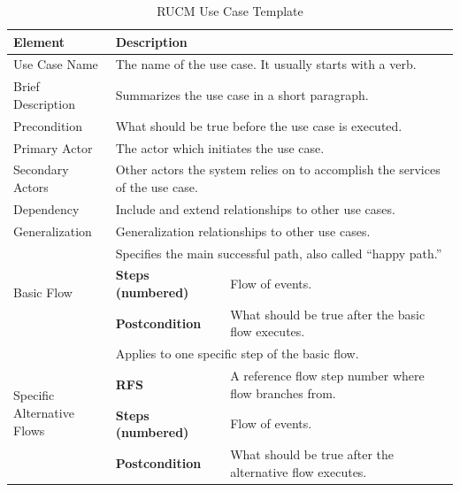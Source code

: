 \begin{table}[htbp]
  \centering
  \caption{RUCM Use Case Template}
	\begin{adjustbox}{width=1\textwidth}
    \begin{tabular}{|l|l|l|l|l|l|l|l|}
    \toprule
    Element & \multicolumn{7}{l|}{ Description} \\
    \midrule
    Use Case Name & \multicolumn{7}{l|}{ The name of the use case. It usually starts with a verb.} \\
    \midrule
    Brief Description  & \multicolumn{7}{l|}{Summarizes the use case in a short paragraph.} \\
    \midrule
    Precondition & \multicolumn{7}{l|}{ What should be true before the use case is executed.} \\
    \midrule
    Primary Actor  & \multicolumn{7}{l|}{The actor which initiates the use case.} \\
    \midrule
    Secondary Actors & \multicolumn{7}{l|}{ Other actors the system relies on to accomplish the services of the use case.} \\
    \midrule
    Dependency & \multicolumn{7}{l|}{ Include and extend relationships to other use cases.} \\
    \midrule
    Generalization & \multicolumn{7}{l|}{ Generalization relationships to other use cases.} \\
    \midrule
    \multirow{3}[6]{*}{Basic Flow} & \multicolumn{7}{l|}{ Specifies the main successful path, also called “happy path.”} \\
\cmidrule{2-8}          & \textbf{Steps (numbered) } & \multicolumn{6}{l|}{Flow of events.} \\
\cmidrule{2-8}          & \textbf{Postcondition} & \multicolumn{6}{l|}{ What should be true after the basic flow executes.} \\
    \midrule
    \multicolumn{1}{|l|}{\multirow{4}[8]{*}{Specific \newline{}Alternative Flows}} & \multicolumn{7}{l|}{Applies to one specific step of the basic flow.} \\
\cmidrule{2-8}          & \textbf{RFS} & \multicolumn{6}{l|}{ A reference flow step number where flow branches from.} \\
\cmidrule{2-8}          & \textbf{Steps (numbered)} & \multicolumn{6}{l|}{ Flow of events.} \\
\cmidrule{2-8}          & \textbf{Postcondition} & \multicolumn{6}{l|}{ What should be true after the alternative flow executes.} \\

\end{tabular}
\end{adjustbox}
\end{table}
